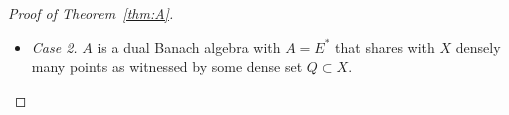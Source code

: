 \documentclass[12pt,fleqn]{amsart}
\theoremstyle{definition}
\numberwithin{equation}{section}
\theoremstyle{remark}
\newcommand{\e}{\varepsilon}
\begin{document}
\begin{proof}[Proof of Theorem~\ref{thm:A}]
\begin{itemize}
Using \eqref{point}, \eqref{eq:FGHi} and \eqref{eq:local-22},
we see that
\begin{equation}\label{eq:local-223}
    \begin{array}{lcl}
    f(x)\cdot g(x) & = & \lim\limits_{n\to\infty} \big( F_{n}(x) \cdot G_{n}(x) \big)\\
        & = & \lim\limits_{n\to\infty}\big( F_{n}(x) \cdot G_{n}(x)+H_{n}(x)\big) \\
        & = & F(x) \cdot G(x)+H(x).
    \end{array}
\end{equation}
Moreover, from \eqref{eq:local-244} we have 
%
\begin{equation}\label{in}
    \begin{split}
        \|f-F\|_{\infty}
        &\leqslant 
        \sum_{n=0}^\infty \|F_{n+1}-F_n\|_{\infty}
         < \e.
    \end{split}
\end{equation}
%
We show that $\|g-G\|_{\infty}<\e$ in the same way.
\item[] \emph{Case 2.} $A$ is a dual Banach algebra with $A = E^*$ that shares with $X$ densely many points as witnessed by some dense set $Q\subset X$.


\end{itemize}
\end{proof}
\end{document}
